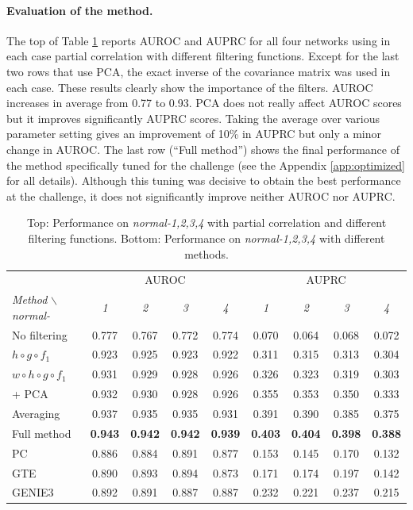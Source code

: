 \documentclass[wcp]{jmlr}
\begin{document}
\paragraph{Evaluation of the method.}

The top of Table \ref{tab:comparison} reports AUROC and AUPRC for all
four networks using in each case partial correlation with different
filtering functions. Except for the last two rows that use PCA, the
exact inverse of the covariance matrix was used in each case. These
results clearly show the importance of the filters. AUROC increases in
average from 0.77 to 0.93. PCA does not really affect AUROC scores but
it improves significantly AUPRC scores. Taking the average over
various parameter setting gives an improvement of 10\% in AUPRC but
only a minor change in AUROC. The last row (``Full method'') shows the
final performance of the method specifically tuned for the challenge
(see the Appendix \ref{app:optimized} for all details). Although this
tuning was decisive to obtain the best performance at the challenge,
it does not significantly improve neither AUROC nor AUPRC.

\begin{table}[t]\label{tab:comparison}
\centering
\small
\begin{tabular}{| l | c c c c | c c c c |}
\hline
& \multicolumn{4}{c|}{AUROC} & \multicolumn{4}{c|}{AUPRC} \\
\textit{Method} $\backslash$ \textit{normal-} & \textit{1} & \textit{2} & \textit{3} & \textit{4} & \textit{1} & \textit{2} & \textit{3} & \textit{4} \\
\hline
\hline
No  filtering       					& 0.777 & 0.767 & 0.772 & 0.774 & 0.070 & 0.064 & 0.068 & 0.072\\
$ h \circ g \circ f_1$                  & 0.923 & 0.925 & 0.923 & 0.922 & 0.311 & 0.315 & 0.313 & 0.304\\
$ w \circ h \circ g \circ f_1$          & 0.931 & 0.929 & 0.928 & 0.926 & 0.326 & 0.323 & 0.319 & 0.303\\
+ PCA         							& 0.932 & 0.930 & 0.928 & 0.926 & 0.355 & 0.353 & 0.350 & 0.333\\
Averaging           					& 0.937 & 0.935 & 0.935 & 0.931 & 0.391 &  0.390 &  0.385 & 0.375\\
Full method           					& \textbf{0.943} & \textbf{0.942} & \textbf{0.942} & \textbf{0.939} & \textbf{0.403} & \textbf{0.404} & \textbf{0.398} & \textbf{0.388}\\
\hline
PC & 0.886 & 0.884 & 0.891 &  0.877 & 0.153 & 0.145 & 0.170 & 0.132\\
GTE & 0.890 & 0.893 & 0.894 & 0.873 & 0.171 & 0.174 & 0.197 & 0.142\\
GENIE3 & 0.892 & 0.891 & 0.887 & 0.887 & 0.232 & 0.221 & 0.237 & 0.215 \\
\hline
\end{tabular}
\caption{Top: Performance on \textit{normal-1,2,3,4} with partial correlation and different filtering functions.
Bottom: Performance on \textit{normal-1,2,3,4} with different methods.}
\end{table}
\end{document}
